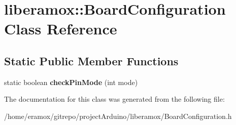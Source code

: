 \hypertarget{classliberamox_1_1BoardConfiguration}{}\section{liberamox\+:\+:Board\+Configuration Class Reference}
\label{classliberamox_1_1BoardConfiguration}
\subsection*{Static Public Member Functions}
\begin{DoxyCompactItemize}
\item 
static boolean {\bfseries check\+Pin\+Mode} (int mode)\hypertarget{classliberamox_1_1BoardConfiguration_aeb3c6feff1a621635d049f965ecf8bf4}{}\label{classliberamox_1_1BoardConfiguration_aeb3c6feff1a621635d049f965ecf8bf4}

\end{DoxyCompactItemize}


The documentation for this class was generated from the following file\+:\begin{DoxyCompactItemize}
\item 
/home/eramox/gitrepo/project\+Arduino/liberamox/Board\+Configuration.\+h\end{DoxyCompactItemize}
